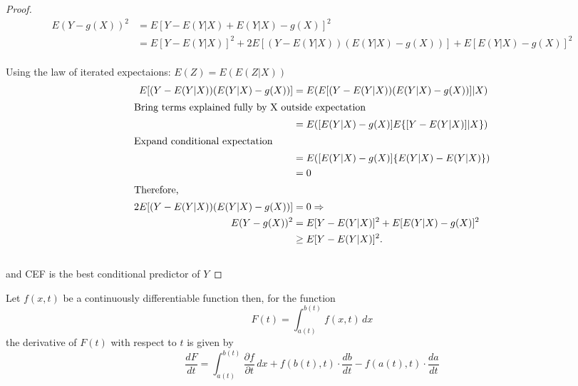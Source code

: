 \documentclass[DIV=14,titlepage=false]{scrreprt}
\begin{document}
\begin{proof}
  \begin{align*}
    E(Y - g(X))^2 &= E[Y - E(Y|X) + E(Y|X) - g(X)]^2 \\
    &= E[Y - E(Y|X)]^2 + 2E[(Y - E(Y|X))(E(Y|X) - g(X))] + E[E(Y|X) - g(X)]^2 
  \end{align*}\\
  Using the law of iterated expectaions: $E(Z) = E(E(Z|X))$
  \begin{align*}
    E[(Y - E(Y|X))(E(Y|X) - g(X))] &= E(E[(Y - E(Y|X))(E(Y|X) - g(X))]|X) \\
    \intertext{Bring terms explained fully by X outside expectation}
    &= E([E(Y|X) - g(X)]E\{[Y - E(Y|X)]|X\}) \\
    \intertext{Expand conditional expectation}
    &= E([E(Y|X) - g(X)]\{E(Y|X) - E(Y|X)\}) \\
    &= 0 \\
    \intertext{Therefore,}
    2E[(Y - E(Y|X))(E(Y|X) - g(X))] &= 0 \implies\\
    E(Y - g(X))^2 &= E[Y - E(Y|X)]^2 + E[E(Y|X) - g(X)]^2 \\
    &\geq E[Y - E(Y|X)]^2.
  \end{align*}\\
    and CEF is the best conditional predictor of \( Y \)
\end{proof}

\begin{lemma}
  Let \( f(x, t) \) be a continuously differentiable function then, for the function
  \[  F(t) = \int_{a(t)}^{b(t)} f(x, t) \, dx  \]
  the derivative of \( F(t) \) with respect to \( t \) is given by
  \[  \frac{dF}{dt} = \int_{a(t)}^{b(t)} \frac{\partial f}{\partial t} \, dx + f(b(t), t) \cdot \frac{db}{dt} - f(a(t), t) \cdot \frac{da}{dt}  \]
\end{lemma}
\end{document}
